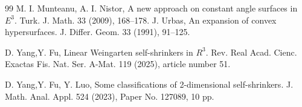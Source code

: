 \documentclass[a4paper,12pt]{amsart}
\theoremstyle{definition}
\begin{document}
\begin{thebibliography}{99}
 M. I. Munteanu, A. I. Nistor, A new approach on constant angle surfaces in $E^3$. Turk. J. Math. 33 (2009), 168--178.
 J. Urbas,  An expansion of convex hypersurfaces. J. Differ. Geom. 33  (1991), 91--125.

 D. Yang,Y. Fu,   Linear Weingarten self-shrinkers in $R^3$. Rev. Real Acad. Cienc. Exactas Fis. Nat. Ser. A-Mat. 119  (2025), article number 51.

  D. Yang,Y. Fu, Y. Luo, Some classifications of 2-dimensional self-shrinkers. J. Math. Anal. Appl. 524 (2023),   Paper No. 127089, 10 pp.
\end{thebibliography}
\end{document}
